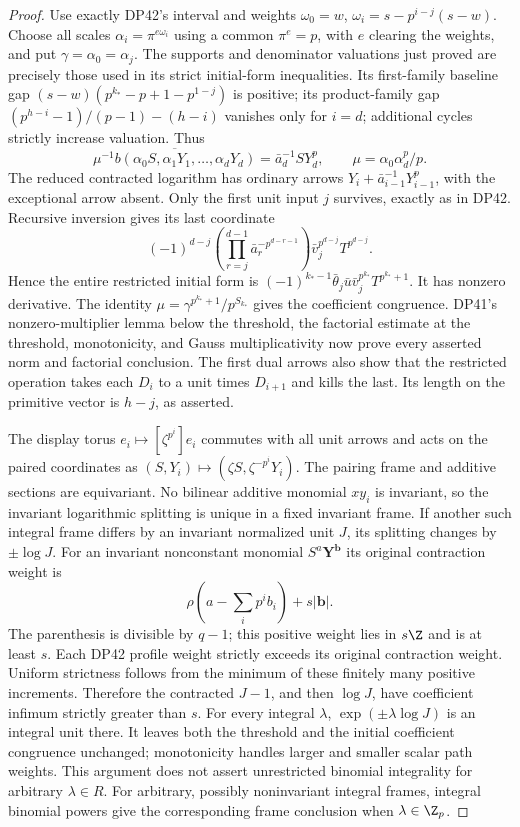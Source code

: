 \begin{proof}
Use exactly DP42's interval and weights
$\omega_0=w$, $\omega_i=s-p^{i-j}(s-w)$.
Choose all scales $\alpha_i=\pi^{e\omega_i}$ using a common $\pi^e=p$, with $e$ clearing the weights, and put $\gamma=\alpha_0=\alpha_j$.
The supports and denominator valuations just proved are precisely those used in its strict initial-form inequalities. Its first-family baseline gap
$(s-w)(p^{k_*}-p+1-p^{1-j})$ is positive; its product-family gap
$(p^{h-i}-1)/(p-1)-(h-i)$ vanishes only for $i=d$; additional cycles strictly increase valuation. Thus
\[
 \overline{\mu^{-1}b(\alpha_0S,\alpha_1Y_1,\ldots,\alpha_dY_d)}
       =\bar a_d^{-1}SY_d^p,\qquad \mu=\alpha_0\alpha_d^p/p.
\]
The reduced contracted logarithm has ordinary arrows
$Y_i+\bar a_{i-1}^{-1}Y_{i-1}^p$, with the exceptional arrow absent.
Only the first unit input $j$ survives, exactly as in DP42.
Recursive inversion gives its last coordinate
\[
 (-1)^{d-j}
 \left(\prod_{r=j}^{d-1}\bar a_r^{-p^{d-r-1}}\right)
 \bar v_j^{p^{d-j}}T^{p^{d-j}}.
\]
Hence the entire restricted initial form is
$(-1)^{k_*-1}\bar\theta_j\bar u\bar v_j^{p^{k_*}}T^{p^{k_*}+1}$.
It has nonzero derivative. The identity
$\mu=\gamma^{p^{k_*}+1}/p^{S_{k_*}}$ gives the coefficient congruence.
DP41's nonzero-multiplier lemma below the threshold, the factorial estimate at the threshold, monotonicity, and Gauss multiplicativity now prove every asserted norm and factorial conclusion.
The first dual arrows also show that the restricted operation takes each $D_i$ to a unit times $D_{i+1}$ and kills the last. Its length on the primitive vector is $h-j$, as asserted.

The display torus $e_i\mapsto[\zeta^{p^i}]e_i$ commutes with all unit arrows and acts on the paired coordinates as
$(S,Y_i)\mapsto(\zeta S,\zeta^{-p^i}Y_i)$.
The pairing frame and additive sections are equivariant. No bilinear additive monomial $xy_i$ is invariant, so the invariant logarithmic splitting is unique in a fixed invariant frame.
If another such integral frame differs by an invariant normalized unit $J$, its splitting changes by $\pm\log J$.
For an invariant nonconstant monomial $S^a\mathbf Y^{\mathbf b}$ its original contraction weight is
\[
 \rho\left(a-\sum_ip^ib_i\right)+s|\mathbf b|.
\]
The parenthesis is divisible by $q-1$; this positive weight lies in $s\Z$ and is at least $s$.
Each DP42 profile weight strictly exceeds its original contraction weight. Uniform strictness follows from the minimum of these finitely many positive increments. Therefore the contracted $J-1$, and then $\log J$, have coefficient infimum strictly greater than $s$.
For every integral $\lambda$, $\exp(\pm\lambda\log J)$ is an integral unit there. It leaves both the threshold and the initial coefficient congruence unchanged; monotonicity handles larger and smaller scalar path weights.
This argument does not assert unrestricted binomial integrality for arbitrary $\lambda\in R$. For arbitrary, possibly noninvariant integral frames, integral binomial powers give the corresponding frame conclusion when $\lambda\in\Z_p$.


\end{proof}
